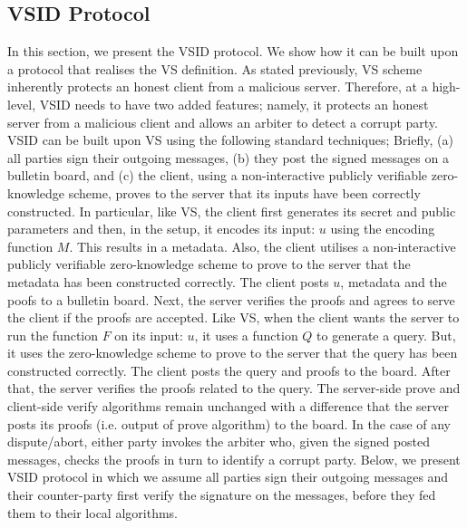 

\subsection{VSID Protocol}


In this section, we present the VSID protocol. We show how it  can be built upon a protocol that realises the VS definition.  As stated previously, VS scheme inherently protects an honest client from a malicious server. Therefore, at a high-level, VSID needs to have two added features; namely, it protects an honest server from a malicious client and allows an arbiter to detect a corrupt party. VSID can be built upon VS using  the following standard techniques; Briefly, (a) all parties sign their outgoing messages, (b) they post the signed messages on a bulletin board, and (c) the client, using a non-interactive publicly verifiable zero-knowledge scheme, proves to the server that its inputs have been correctly constructed.   In particular, like VS, the client first generates its secret and public parameters and then, in the setup, it encodes its input: $u$ using the encoding function $M$. This results in a  metadata.  Also, the client   utilises a non-interactive publicly verifiable zero-knowledge scheme to prove to the server that the metadata has been constructed correctly.  The client posts $u$, metadata and the poofs to a bulletin board. Next, the server verifies the proofs and agrees to serve the client if the proofs are accepted.  Like VS, when the client wants the server to run the function $F$ on its input: $u$, it uses a function $Q$ to generate a query. But, it uses the zero-knowledge scheme to prove to the server that the query has been constructed correctly. The client posts the query and proofs to the board. After that, the server verifies the  proofs related to the query. The server-side prove  and client-side verify algorithms remain unchanged with a difference that the server posts its proofs (i.e. output of prove algorithm) to the board.  In the case of any dispute/abort, either party invokes the arbiter who, given the signed posted messages,  checks the proofs in turn to identify a corrupt party. Below, we present VSID protocol in which we assume all parties sign their outgoing messages and their counter-party first verify the signature on the messages, before they  fed them to their local algorithms. %


